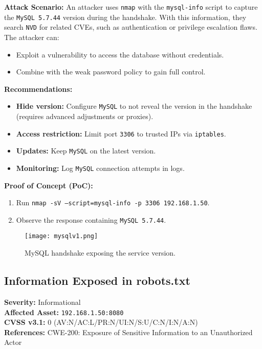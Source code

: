 \documentclass[a4paper,12pt]{article}
\begin{document}
\textbf{Attack Scenario:}  
An attacker uses \texttt{nmap} with the \texttt{mysql-info} script to capture the \texttt{MySQL 5.7.44} version during the handshake. With this information, they search \texttt{NVD} for related CVEs, such as authentication or privilege escalation flaws. The attacker can:  
\begin{itemize}
    \item Exploit a vulnerability to access the database without credentials.  
    \item Combine with the weak password policy to gain full control.  
\end{itemize}

\textbf{Recommendations:}  
\begin{itemize}
    \item \textbf{Hide version:} Configure \texttt{MySQL} to not reveal the version in the handshake (requires advanced adjustments or proxies).  
    \item \textbf{Access restriction:} Limit port \texttt{3306} to trusted IPs via \texttt{iptables}.  
    \item \textbf{Updates:} Keep \texttt{MySQL} on the latest version.  
    \item \textbf{Monitoring:} Log \texttt{MySQL} connection attempts in logs.  
\end{itemize}

\textbf{Proof of Concept (PoC):}  
\begin{enumerate}
    \item Run \texttt{nmap -sV --script=mysql-info -p 3306 192.168.1.50}.  
    \item Observe the response containing \texttt{MySQL 5.7.44}.  
\end{enumerate}

\begin{figure}[ht]
    \centering
    \texttt{[image: mysqlv1.png]}
    \caption{MySQL handshake exposing the service version.}
\end{figure}

\clearpage

\subsection{Information Exposed in robots.txt}
\textbf{Severity:} \textcolor{Periwinkle}{Informational} \\
\textbf{Affected Asset:} \texttt{192.168.1.50:8080} \\
\textbf{CVSS v3.1:} 0 (AV:N/AC:L/PR:N/UI:N/S:U/C:N/I:N/A:N) \\
\textbf{References:} CWE-200: Exposure of Sensitive Information to an Unauthorized Actor
\end{document}
